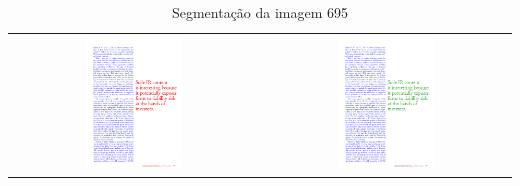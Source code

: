 \documentclass[a4paper,11pt]{article}
\begin{document}
    \begin{table}[p]
      \caption{Segmentação da imagem 695}
      \begin{center}
        \begin{tabular}{ c c }
        \includegraphics[width=0.4\textwidth]{assets/final_ideal/cacm_695_ideal.png}
        &
        \includegraphics[width=0.4\textwidth]{assets/result_imagens/cacm_50_percent_sparse_9x9_695_final.png}
        \end{tabular}
      \end{center}
      \label{tab:segmentation_695}
    \end{table}
\end{document}

